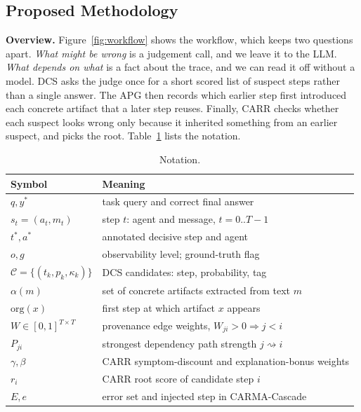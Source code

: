 \documentclass[conference]{IEEEtran}
\begin{document}
\subsection{Proposed Methodology}
\textbf{Overview.} Figure~\ref{fig:workflow} shows the workflow, which keeps two questions apart. \emph{What might be wrong} is a judgement call, and we leave it to the LLM. \emph{What depends on what} is a fact about the trace, and we can read it off without a model. DCS asks the judge once for a short scored list of suspect steps rather than a single answer. The APG then records which earlier step first introduced each concrete artifact that a later step reuses. Finally, CARR checks whether each suspect looks wrong only because it inherited something from an earlier suspect, and picks the root. Table~\ref{tab:notation} lists the notation.



\begin{table}[t]
\centering
\caption{Notation.}
\label{tab:notation}
\footnotesize
\begin{tabular}{@{}l@{\hspace{4pt}}p{}@{}}
\toprule
Symbol & Meaning \\
\midrule
$q, y^*$ & task query and correct final answer \\
$s_t=(a_t,m_t)$ & step $t$: agent and message, $t=0..T{-}1$ \\
$t^*, a^*$ & annotated decisive step and agent \\
$o, g$ & observability level; ground-truth flag \\
$\mathcal{C}=\{(t_k,p_k,\kappa_k)\}$ & DCS candidates: step, probability, tag \\
$\alpha(m)$ & set of concrete artifacts extracted from text $m$ \\
$\mathrm{org}(x)$ & first step at which artifact $x$ appears \\
$W\in[0,1]^{T\times T}$ & provenance edge weights, $W_{ji}>0\Rightarrow j<i$ \\
$P_{ji}$ & strongest dependency path strength $j\rightsquigarrow i$ \\
$\gamma,\beta$ & CARR symptom-discount and explanation-bonus weights \\
$r_i$ & CARR root score of candidate step $i$ \\
$E, e$ & error set and injected step in CARMA-Cascade \\
\bottomrule
\end{tabular}
\end{table}
\end{document}
